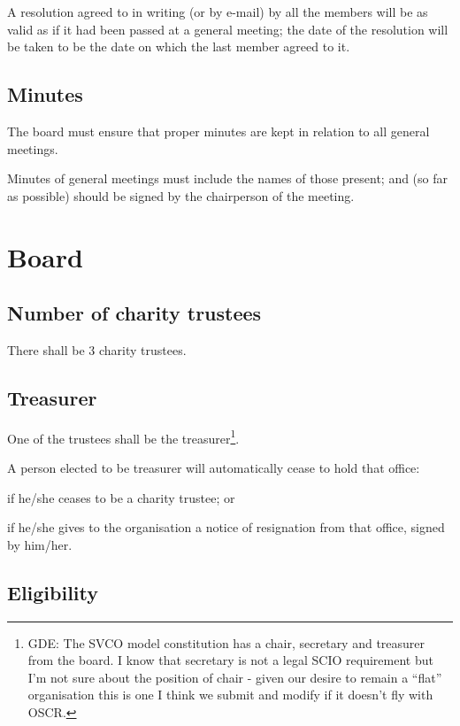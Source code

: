 \documentclass{article}
\begin{document}
\clause A resolution agreed to in writing (or by e-mail) by all the
members will be as valid as if it had been passed at a general
meeting; the date of the resolution will be taken to be the date on
which the last member agreed to it.

\subsection{Minutes}

\clause The board must ensure that proper minutes are kept in relation
to all general meetings.

\clause Minutes of general meetings must include the names of those
present; and (so far as possible) should be signed by the chairperson
of the meeting.

\section{Board}

\subsection{Number of charity trustees}

\clause There shall be 3 charity trustees.

\subsection{Treasurer}

\clause One of the trustees shall be the treasurer\footnote{GDE: The
  SVCO model constitution has a chair, secretary and treasurer from
  the board. I know that secretary is not a legal SCIO requirement but
  I'm not sure about the position of chair - given our desire to
  remain a ``flat'' organisation this is one I think we submit and
  modify if it doesn't fly with OSCR.}.

\clause A person elected to be treasurer will automatically cease to
hold that office:

\subclause if he/she ceases to be a charity trustee; or

\subclause if he/she gives to the organisation a notice of resignation
from that office, signed by him/her.

\subsection{Eligibility}
\end{document}
